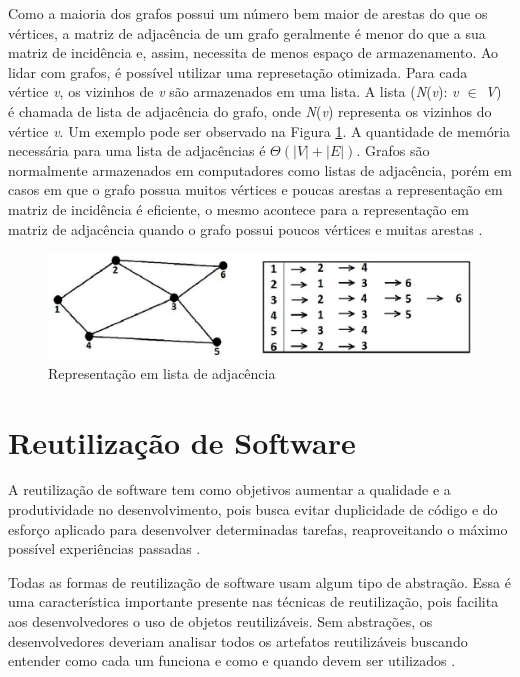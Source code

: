Como a maioria dos grafos possui um número bem maior de arestas do que os vértices, a matriz de adjacência de um grafo geralmente é menor do que a sua matriz de incidência e, assim, necessita de menos espaço de armazenamento. Ao lidar com grafos, é possível utilizar uma represetação otimizada. Para cada vértice \textit{v}, os vizinhos de \textit{v} são armazenados em uma lista. A lista (\textit{N}(\textit{v}): \textit{v $\in$ V}) é chamada de lista de adjacência do grafo, onde \textit{N}(\textit{v}) representa os vizinhos do vértice \textit{v}. Um exemplo pode ser observado na Figura \ref{lista_adjacencia}. A quantidade de memória necessária para uma lista de adjacências é $\Theta(|\textit{V}| + |\textit{E}|)$. Grafos são normalmente armazenados em computadores como listas de adjacência, porém em casos em que o grafo possua muitos vértices e poucas arestas a representação em matriz de incidência é eficiente, o mesmo acontece para a representação em matriz de adjacência quando o grafo possui poucos vértices e muitas arestas \cite{Costa:2011}.

\begin{figure}[!h]
	\centering
	\includegraphics[scale=0.3]{figuras/capitulo2/lista_adjacencia.eps}
	\caption[Representação em lista de adjacência]{Representação em lista de adjacência \cite{Costa:2011}}
	\label{lista_adjacencia}
\end{figure}

\section{Reutilização de Software}
\label{sec:reutilizacao_software}

A reutilização de software tem como objetivos aumentar a qualidade e a produtividade no desenvolvimento, pois busca evitar duplicidade de código e do esforço aplicado para desenvolver determinadas tarefas, reaproveitando o máximo possível experiências passadas \cite{Lucredio:2009}.

Todas as formas de reutilização de software usam algum tipo de abstração.  Essa é uma característica importante presente nas técnicas de reutilização, pois facilita aos desenvolvedores o uso de objetos reutilizáveis. Sem abstrações, os desenvolvedores deveriam analisar todos os artefatos reutilizáveis buscando entender como cada um funciona e como e quando devem ser utilizados \cite{Krueger:1992}.

